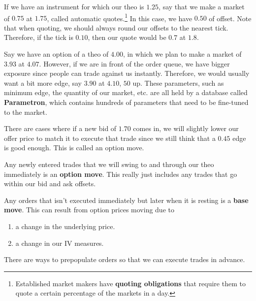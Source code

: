 \documentclass{article}
\begin{document}
    If we have an instrument for which our theo is $1.25$, say that we make a market of $0.75$ at $1.75$, called automatic quotes.\footnote{Established market makers have \textbf{quoting obligations} that require them to quote a certain percentage of the markets in a day.} In this case, we have $0.50$ of offset. Note that when quoting, we should always round our offsets to the nearest tick. Therefore, if the tick is $0.10$, then our quote would be $0.7$ at $1.8$.

    \begin{definition}[Quotes (AQ)]
      Say we have an option of a theo of $4.00$, in which we plan to make a market of $3.93$ at $4.07$. However, if we are in front of the order queue, we have bigger exposure since people can trade against us instantly. Therefore, we would usually want a bit more edge, say $3.90$ at $4.10$, $50$ up. These parameters, such as minimum edge, the quantity of our market, etc. are all held by a database called \textbf{Parametron}, which contains hundreds of parameters that need to be fine-tuned to the market.
    \end{definition}

    There are cases where if a new bid of $1.70$ comes in, we will slightly lower our offer price to match it to execute that trade since we still think that a $0.45$ edge is good enough. This is called an option move. 

    \begin{definition}
      Any newly entered trades that we will swing to and through our theo immediately is an \textbf{option move}. This really just includes any trades that go within our bid and ask offsets. 
    \end{definition}

    \begin{definition}
      Any orders that isn't executed immediately but later when it is resting is a \textbf{base move}. This can result from option prices moving due to  
      \begin{enumerate}
        \item a change in the underlying price. 
        \item a change in our IV measures. 
      \end{enumerate}
      There are ways to prepopulate orders so that we can execute trades in advance.
    \end{definition}
\end{document}
